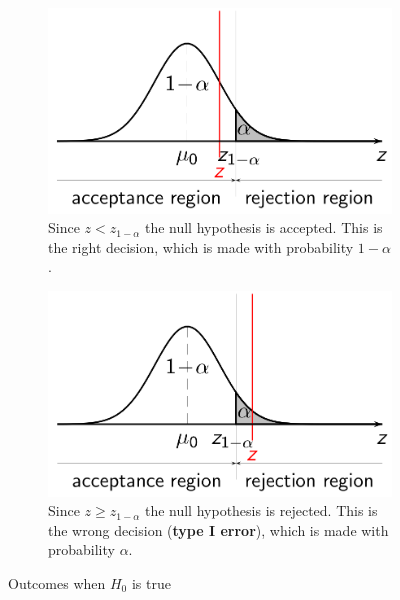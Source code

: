 \documentclass[11pt]{article}
\theoremstyle{definition}
\begin{document}
\begin{figure}[H]
	\begin{subfigure}{0.48\linewidth}
		\includegraphics[width=\linewidth]{img/type_I_correct.png}
		\caption{Since $z < z_{1-\alpha}$ the null hypothesis is accepted. This is the right decision, which is made with probability $1 - \alpha$.}
	\end{subfigure}
	\hfill
	\begin{subfigure}{0.48\linewidth}
		\includegraphics[width=\linewidth]{img/type_I_false.png}
		\caption{Since $z \geq z_{1-\alpha}$ the null hypothesis is rejected. This is the wrong decision (\textbf{type I error}), which is made with probability $\alpha$.}
	\end{subfigure}
	\caption{Outcomes when $H_0$ is true}
\end{figure}
\end{document}
